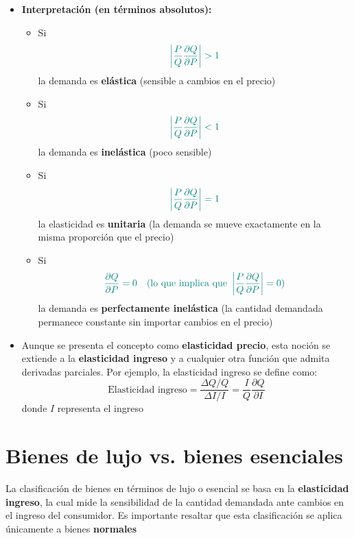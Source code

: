 \documentclass{article}
\begin{document}
\begin{itemize}
    \item \textbf{\color{teal}Interpretación (en términos absolutos):}
    \begin{itemize}
        \item Si 
        \[\color{teal}
        \left|\frac{P}{Q}\frac{\partial Q}{\partial P}\right| > 1
        \]
        la demanda es \textbf{elástica} (sensible a cambios en el precio)
        
        \item Si 
        \[\color{teal}
        \left|\frac{P}{Q}\frac{\partial Q}{\partial P}\right| < 1
        \]
        la demanda es \textbf{inelástica} (poco sensible)
        
        \item Si 
        \[\color{teal}
        \left|\frac{P}{Q}\frac{\partial Q}{\partial P}\right| = 1
        \]
        la elasticidad es \textbf{unitaria} (la demanda se mueve exactamente en la misma proporción que el precio)
        
        \item Si 
        \[\color{teal}
        \frac{\partial Q}{\partial P} = 0 \quad (\text{lo que implica que } \left|\frac{P}{Q}\frac{\partial Q}{\partial P}\right| = 0)
        \]
        la demanda es \textbf{perfectamente inelástica} (la cantidad demandada permanece constante sin importar cambios en el precio)
    \end{itemize}
    
    \item Aunque se presenta el concepto como \textbf{elasticidad precio}, esta noción se extiende a la \textbf{elasticidad ingreso} y a cualquier otra función que admita derivadas parciales. Por ejemplo, la elasticidad ingreso se define como:
    \begin{equation*}
    \text{Elasticidad ingreso} = \frac{\Delta Q/Q}{\Delta I/I} = \frac{I}{Q}\frac{\partial Q}{\partial I}
    \end{equation*}
    donde \(I\) representa el ingreso
\end{itemize}
\section*{Bienes de lujo vs. bienes esenciales}

La clasificación de bienes en términos de lujo o esencial se basa en la \textbf{elasticidad ingreso}, la cual mide la sensibilidad de la cantidad demandada ante cambios en el ingreso del consumidor. Es importante resaltar que esta clasificación se aplica únicamente a bienes \textbf{normales}
\end{document}
